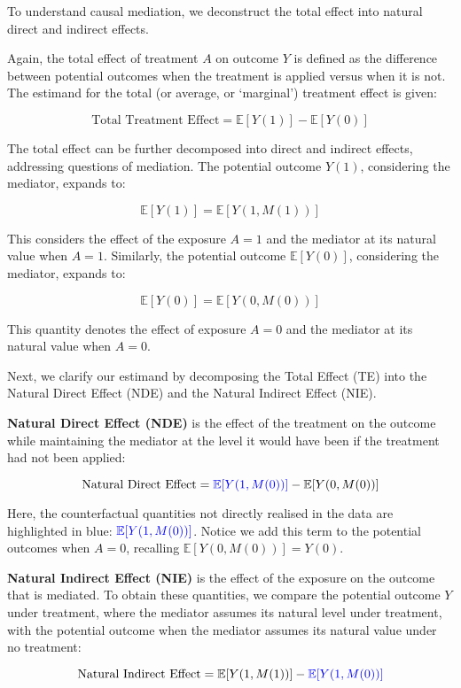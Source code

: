 \documentclass[
  single column]{article}
\begin{document}
To understand causal mediation, we deconstruct the total effect into
natural direct and indirect effects.

Again, the total effect of treatment \(A\) on outcome \(Y\) is defined
as the difference between potential outcomes when the treatment is
applied versus when it is not. The estimand for the total (or average,
or `marginal') treatment effect is given:

\[
\text{Total Treatment Effect} = \mathbb{E}[Y(1)] - \mathbb{E}[Y(0)]
\]

The total effect can be further decomposed into direct and indirect
effects, addressing questions of mediation. The potential outcome
\(Y(1)\), considering the mediator, expands to:

\[ 
\mathbb{E}[Y(1)] = \mathbb{E}[Y(1, M(1))]
\]

This considers the effect of the exposure \(A = 1\) and the mediator at
its natural value when \(A = 1\). Similarly, the potential outcome
\(\mathbb{E}[Y(0)]\), considering the mediator, expands to:

\[ 
\mathbb{E}[Y(0)] = \mathbb{E}[Y(0, M(0))]
\]

This quantity denotes the effect of exposure \(A = 0\) and the mediator
at its natural value when \(A = 0\).

Next, we clarify our estimand by decomposing the Total Effect (TE) into
the Natural Direct Effect (NDE) and the Natural Indirect Effect (NIE).

\textbf{Natural Direct Effect (NDE)} is the effect of the treatment on
the outcome while maintaining the mediator at the level it would have
been if the treatment had not been applied:

\[
\text{Natural Direct Effect} = \textcolor{blue}{\mathbb{E}[Y(1, M(0))]} - \mathbb{E}[Y(0, M(0))]
\]

Here, the counterfactual quantities not directly realised in the data
are highlighted in blue: \(\textcolor{blue}{\mathbb{E}[Y(1, M(0))]}\).
Notice we add this term to the potential outcomes when \(A = 0\),
recalling \(\mathbb{E}[Y(0, M(0))] = Y(0)\).

\textbf{Natural Indirect Effect (NIE)} is the effect of the exposure on
the outcome that is mediated. To obtain these quantities, we compare the
potential outcome \(Y\) under treatment, where the mediator assumes its
natural level under treatment, with the potential outcome when the
mediator assumes its natural value under no treatment:

\[
\text{Natural Indirect Effect} = \mathbb{E}[Y(1, M(1))] - \textcolor{blue}{\mathbb{E}[Y(1, M(0))]}
\]
\end{document}
